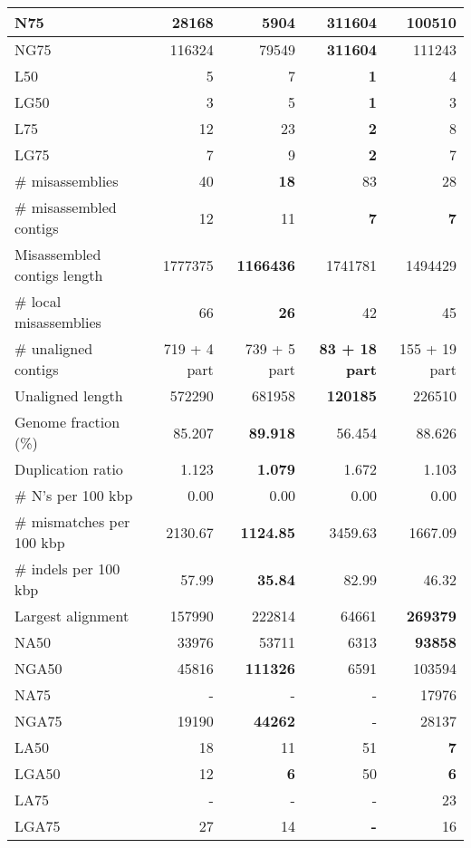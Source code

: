 \documentclass[12pt,a4paper]{article}
\begin{document}
\begin{table}[ht]
\begin{center}
\begin{tabular}{|l*{4}{|r}|}
N75 & 28168 & 5904 & {\bf 311604} & 100510 \\ \hline
NG75 & 116324 & 79549 & {\bf 311604} & 111243 \\ \hline
L50 & 5 & 7 & {\bf 1} & 4 \\ \hline
LG50 & 3 & 5 & {\bf 1} & 3 \\ \hline
L75 & 12 & 23 & {\bf 2} & 8 \\ \hline
LG75 & 7 & 9 & {\bf 2} & 7 \\ \hline
\# misassemblies & 40 & {\bf 18} & 83 & 28 \\ \hline
\# misassembled contigs & 12 & 11 & {\bf 7} & {\bf 7} \\ \hline
Misassembled contigs length & 1777375 & {\bf 1166436} & 1741781 & 1494429 \\ \hline
\# local misassemblies & 66 & {\bf 26} & 42 & 45 \\ \hline
\# unaligned contigs & 719 + 4 part & 739 + 5 part & {\bf 83 + 18 part} & 155 + 19 part \\ \hline
Unaligned length & 572290 & 681958 & {\bf 120185} & 226510 \\ \hline
Genome fraction (\%) & 85.207 & {\bf 89.918} & 56.454 & 88.626 \\ \hline
Duplication ratio & 1.123 & {\bf 1.079} & 1.672 & 1.103 \\ \hline
\# N's per 100 kbp & 0.00 & 0.00 & 0.00 & 0.00 \\ \hline
\# mismatches per 100 kbp & 2130.67 & {\bf 1124.85} & 3459.63 & 1667.09 \\ \hline
\# indels per 100 kbp & 57.99 & {\bf 35.84} & 82.99 & 46.32 \\ \hline
Largest alignment & 157990 & 222814 & 64661 & {\bf 269379} \\ \hline
NA50 & 33976 & 53711 & 6313 & {\bf 93858} \\ \hline
NGA50 & 45816 & {\bf 111326} & 6591 & 103594 \\ \hline
NA75 & - & - & - & 17976 \\ \hline
NGA75 & 19190 & {\bf 44262} & - & 28137 \\ \hline
LA50 & 18 & 11 & 51 & {\bf 7} \\ \hline
LGA50 & 12 & {\bf 6} & 50 & {\bf 6} \\ \hline
LA75 & - & - & - & 23 \\ \hline
LGA75 & 27 & 14 & {\bf -} & 16 \\ \hline
\end{tabular}
\end{center}
\end{table}
\end{document}
